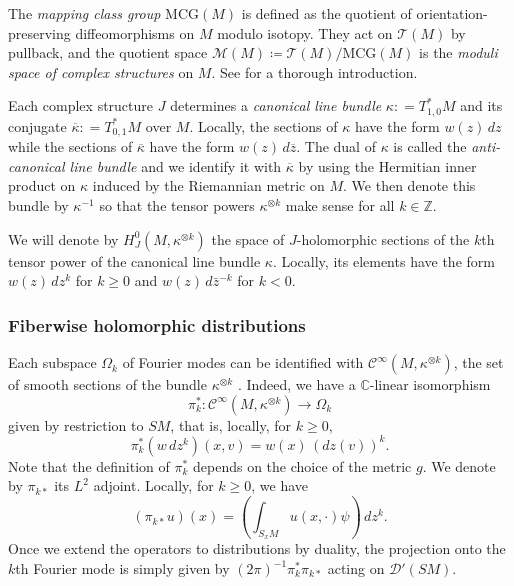 \documentclass[reqno,12pt,letterpaper]{amsart}
\theoremstyle{definition}
\theoremstyle{remark}
\theoremstyle{definition}
\numberwithin{equation}{section}
\newcommand{\Z}{\mathbb{Z}}
\begin{document}
The \textit{mapping class group} $\text{MCG}(M)$ is defined as the quotient of orientation-preserving diffeomorphisms on $M$ modulo isotopy. They act on $\mathcal{T}(M)$ by pullback, and the quotient space $\mathcal{M}(M)\coloneqq\mathcal{T}(M)/\text{MCG}(M)$ is the \textit{moduli space of complex structures} on $M$. See \cite{farb12} for a thorough introduction. 

Each complex structure $J$ determines a \textit{canonical line bundle} $\kappa : = T^\ast_{1,0} M$ and its conjugate $\overline{\kappa} : = T^\ast_{0,1} M$  over $M$. Locally, the sections of $\kappa$ have the form $w(z)\, dz$ while the sections of $\overline{\kappa}$ have the form $w(z)\, d\overline{z}$. The dual of $\kappa$ is called the \textit{anti-canonical line bundle} and we identify it with $\overline{\kappa}$ by using the Hermitian inner product on $\kappa$ induced by the Riemannian metric on $M$. We then denote this bundle by $\kappa^{-1}$ so that the tensor powers $\kappa^{\otimes k}$ make sense for all $k\in \Z$. 

We will denote by $H^0_J(M, \kappa^{\otimes k})$ the space of $J$-holomorphic sections of the $k$th tensor power of the canonical line bundle $\kappa$. Locally, its elements have the form $w(z)\, dz^k$ for $k\geq 0$ and $w(z)\, d\bar{z}^{-k}$ for $k<0$. 

\subsubsection{Fiberwise holomorphic distributions}\label{subsubsection:fibrewise-holomorphic-distributions} Each subspace $\Omega_k$ of Fourier modes can be identified with $\mathcal{C}^\infty(M, \kappa^{\otimes k})$, the set of smooth sections of the bundle $\kappa^{\otimes k}$ \cite[Lemma 6.1.19]{paternain23b}. Indeed, we have a $\mathbb{C}$-linear isomorphism
$$\pi_k^\ast :\mathcal{C}^\infty(M, \kappa^{\otimes k})\to \Omega_k$$
given by restriction to $SM$, that is, locally, for $k\geq 0$, 
$$\pi^\ast_k(w\, dz^k)(x,v)=w(x)\, (dz(v))^k.$$
Note that the definition of $\pi_k^\ast$ depends on the choice of the metric $g$. We denote by $\pi_{k\ast}$ its $L^2$ adjoint. Locally, for $k\geq 0$, we have
$$(\pi_{k\ast} u)(x)=\left(\int_{S_x M}u(x, \cdot)\psi\right)\, dz^k.$$
Once we extend the operators to distributions by duality, the projection onto the $k$th Fourier mode is simply given by $(2\pi)^{-1}\pi^\ast_k \pi_{k\ast}$ acting on $\mathcal{D}'(SM)$. 
\end{document}
